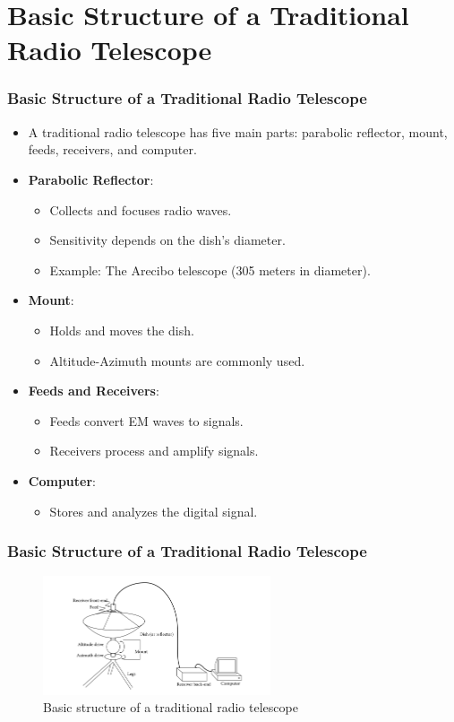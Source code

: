 \documentclass[handout, %
	11pt, %
]{beamer}
\begin{document}
\section{Basic Structure of a Traditional Radio Telescope}
\begin{frame}
    \frametitle{Basic Structure of a Traditional Radio Telescope}
    \begin{itemize}
        \item A traditional radio telescope has five main parts: parabolic reflector, mount, feeds, receivers, and computer.
        \item \textbf{Parabolic Reflector}:
            \begin{itemize}
                \item Collects and focuses radio waves.
                \item Sensitivity depends on the dish's diameter.
                \item Example: The Arecibo telescope (305 meters in diameter).
            \end{itemize}
        \item \textbf{Mount}:
            \begin{itemize}
                \item Holds and moves the dish.
                \item Altitude-Azimuth mounts are commonly used.
            \end{itemize}
        \item \textbf{Feeds and Receivers}:
            \begin{itemize}
                \item Feeds convert EM waves to signals.
                \item Receivers process and amplify signals.
            \end{itemize}
        \item \textbf{Computer}:
            \begin{itemize}
                \item Stores and analyzes the digital signal.
            \end{itemize}
    \end{itemize}
\end{frame}

\begin{frame}
    \frametitle{Basic Structure of a Traditional Radio Telescope}
    \begin{figure}
        \centering
        \includegraphics[width=0.6\textwidth]{Images/radio_telescope_structure.png}
        \caption{Basic structure of a traditional radio telescope}
        \label{fig:radio_telescope_structure}
    \end{figure}
\end{frame}
\end{document}

